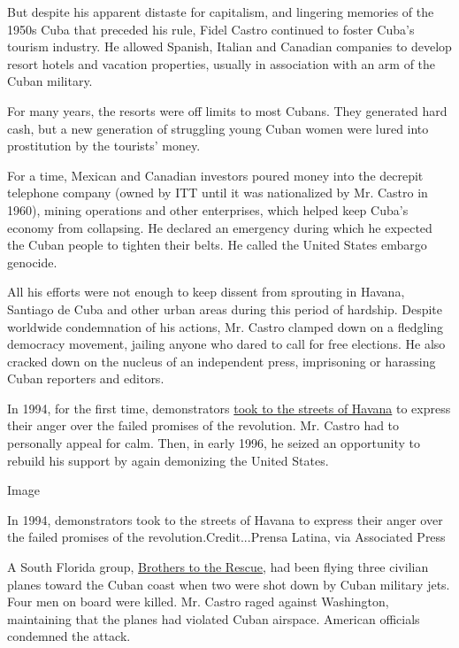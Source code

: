 But despite his apparent distaste for capitalism, and lingering memories
of the 1950s Cuba that preceded his rule, Fidel Castro continued to
foster Cuba's tourism industry. He allowed Spanish, Italian and Canadian
companies to develop resort hotels and vacation properties, usually in
association with an arm of the Cuban military.

For many years, the resorts were off limits to most Cubans. They
generated hard cash, but a new generation of struggling young Cuban
women were lured into prostitution by the tourists' money.

For a time, Mexican and Canadian investors poured money into the
decrepit telephone company (owned by ITT until it was nationalized by
Mr. Castro in 1960), mining operations and other enterprises, which
helped keep Cuba's economy from collapsing. He declared an emergency
during which he expected the Cuban people to tighten their belts. He
called the United States embargo genocide.

All his efforts were not enough to keep dissent from sprouting in
Havana, Santiago de Cuba and other urban areas during this period of
hardship. Despite worldwide condemnation of his actions, Mr. Castro
clamped down on a fledgling democracy movement, jailing anyone who dared
to call for free elections. He also cracked down on the nucleus of an
independent press, imprisoning or harassing Cuban reporters and editors.

In 1994, for the first time, demonstrators
\href{http://www.nytimes3xbfgragh.onion/1994/08/06/world/protesters-battle-police-in-havana-castro-warns-us.html}{took
to the streets of Havana} to express their anger over the failed
promises of the revolution. Mr. Castro had to personally appeal for
calm. Then, in early 1996, he seized an opportunity to rebuild his
support by again demonizing the United States.

Image

In 1994, demonstrators took to the streets of Havana to express their
anger over the failed promises of the revolution.Credit...Prensa Latina,
via Associated Press

A South Florida group,
\href{http://www.nytimes3xbfgragh.onion/1996/02/26/world/pilots-group-firm-foe-of-castro-ignored-risks.html}{Brothers
to the Rescue}, had been flying three civilian planes toward the Cuban
coast when two were shot down by Cuban military jets. Four men on board
were killed. Mr. Castro raged against Washington, maintaining that the
planes had violated Cuban airspace. American officials condemned the
attack.

